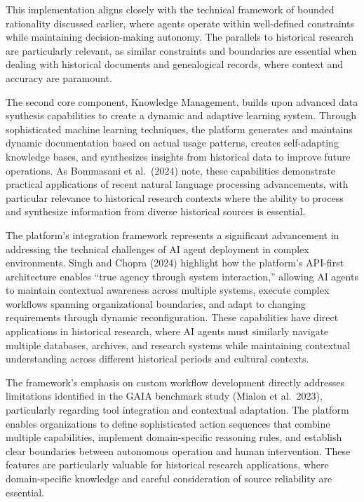 \documentclass[
]{article}
\begin{document}
This implementation aligns closely with the technical framework of
bounded rationality discussed earlier, where agents operate within
well-defined constraints while maintaining decision-making autonomy. The
parallels to historical research are particularly relevant, as similar
constraints and boundaries are essential when dealing with historical
documents and genealogical records, where context and accuracy are
paramount.

The second core component, Knowledge Management, builds upon advanced
data synthesis capabilities to create a dynamic and adaptive learning
system. Through sophisticated machine learning techniques, the platform
generates and maintains dynamic documentation based on actual usage
patterns, creates self-adapting knowledge bases, and synthesizes
insights from historical data to improve future operations. As Bommasani
et al.~(2024) note, these capabilities demonstrate practical
applications of recent natural language processing advancements, with
particular relevance to historical research contexts where the ability
to process and synthesize information from diverse historical sources is
essential.

The platform's integration framework represents a significant
advancement in addressing the technical challenges of AI agent
deployment in complex environments. Singh and Chopra (2024) highlight
how the platform's API-first architecture enables ``true agency through
system interaction,'' allowing AI agents to maintain contextual
awareness across multiple systems, execute complex workflows spanning
organizational boundaries, and adapt to changing requirements through
dynamic reconfiguration. These capabilities have direct applications in
historical research, where AI agents must similarly navigate multiple
databases, archives, and research systems while maintaining contextual
understanding across different historical periods and cultural contexts.

The framework's emphasis on custom workflow development directly
addresses limitations identified in the GAIA benchmark study (Mialon et
al.~2023), particularly regarding tool integration and contextual
adaptation. The platform enables organizations to define sophisticated
action sequences that combine multiple capabilities, implement
domain-specific reasoning rules, and establish clear boundaries between
autonomous operation and human intervention. These features are
particularly valuable for historical research applications, where
domain-specific knowledge and careful consideration of source
reliability are essential.
\end{document}
